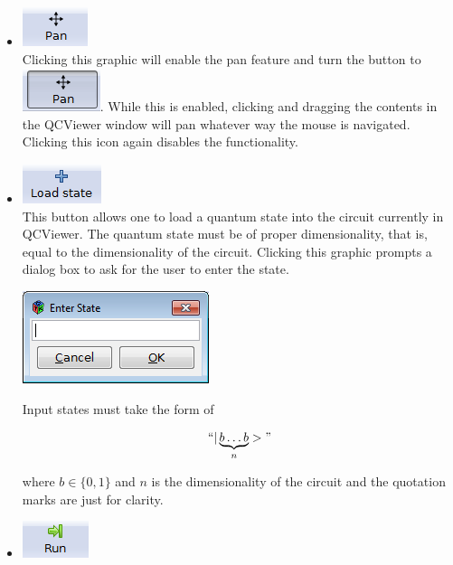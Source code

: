 \documentclass[10pt]{article}
\theoremstyle{definition}
\begin{document}
\begin{itemize}
\item \includegraphics{Figures/Navigation/Pan.png}\\ 

Clicking this graphic will enable the pan feature and turn the button to \includegraphics[scale=0.60]{Figures/Navigation/PanEnabled.png}. While this is enabled, clicking and dragging the contents in the QCViewer window will pan whatever way the mouse is navigated. Clicking this icon again disables the functionality. 

\item \includegraphics{Figures/Navigation/LoadState.png} \\ 

This button allows one to load a quantum state into the circuit currently in QCViewer. The quantum state must be of proper dimensionality, that is, equal to the dimensionality of the circuit. Clicking this graphic prompts a dialog box to ask for the user to enter the state. 

\begin{center}
\includegraphics{Figures/Navigation/LoadStateDialog.png}
\end{center}

Input states must take the form of 

\begin{eqnarray}
``| \underbrace{b \dots b}_n >"  
\end{eqnarray}

where $b \in \{0,1\}$ and $n$ is the dimensionality of the circuit and the quotation marks are just for clarity.

\item \includegraphics{Figures/Navigation/Run.png}\\


\end{itemize}
\end{document}
